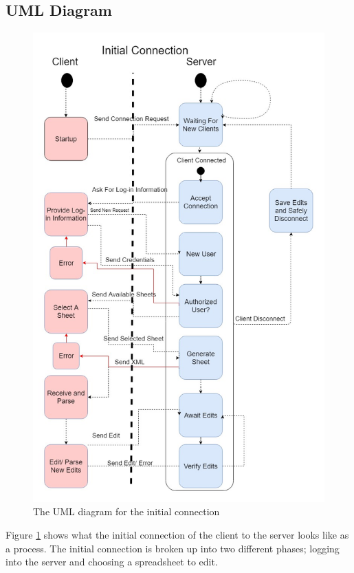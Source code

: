 \documentclass[titlepage]{article}
\begin{document}
    \subsection{UML Diagram}
        \begin{figure}[p]
            \centering
            \includegraphics[width=.8\linewidth]{2-1}
            \caption{The UML diagram for the initial connection}
            \label{fig:connectionUML}
        \end{figure}
        Figure \ref{fig:connectionUML} shows what the initial connection of the client to the server 
            looks like as a process. The initial connection is broken up into two different
            phases; logging into the server and choosing a spreadsheet to edit. 
\end{document}
